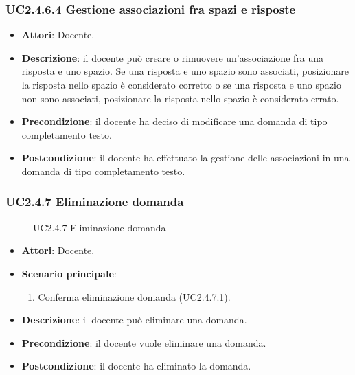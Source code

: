 \subsubsection{UC2.4.6.4 Gestione associazioni fra spazi e risposte}
\begin{itemize}
\item \textbf{Attori}: Docente.
\item \textbf{Descrizione}: il docente può creare o rimuovere un'associazione fra una risposta e uno spazio. Se una risposta e uno spazio sono associati, posizionare la risposta nello spazio è considerato corretto o se una risposta e uno spazio non sono associati, posizionare la risposta nello spazio è considerato errato.
\item \textbf{Precondizione}: il docente ha deciso di modificare una domanda di tipo completamento testo.
\item \textbf{Postcondizione}: il docente ha effettuato la gestione delle associazioni in una domanda di tipo completamento testo.
\end{itemize}
\subsubsection{UC2.4.7 Eliminazione domanda}
\begin{figure}[H]
\centering
\noindent{}
\caption{UC2.4.7 Eliminazione domanda}
\end{figure}
\begin{itemize}
\item \textbf{Attori}: Docente.
\item \textbf{Scenario principale}:
\begin{enumerate}
\item Conferma eliminazione domanda (UC2.4.7.1).
\end{enumerate}
\item \textbf{Descrizione}: il docente può eliminare una domanda.
\item \textbf{Precondizione}: il docente vuole eliminare  una domanda.
\item \textbf{Postcondizione}: il docente ha eliminato la domanda.
\end{itemize}
